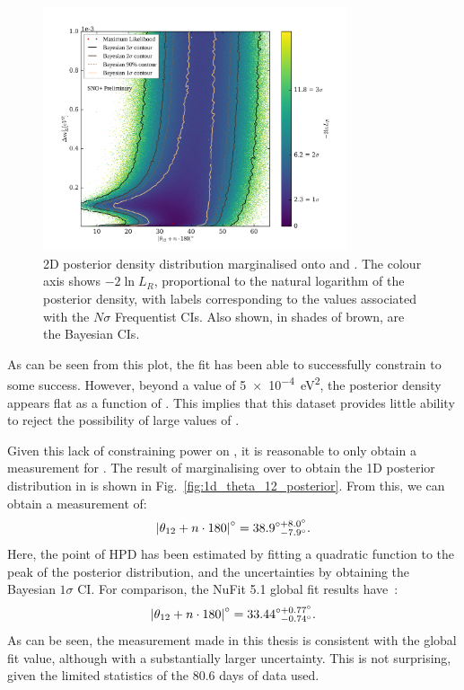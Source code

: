 \begin{figure}
    \centering
    \includegraphics[width=0.8\textwidth]{6_SolarAnalysis/images/steve_style_contours.png}
    \caption[2D posterior density distribution marginalised onto \dmsq{} and \tonetwo{}]
    {2D posterior density distribution marginalised onto \dmsq{} and \tonetwo{}. The colour axis shows $-2\ln{L_{R}}$, proportional to the natural logarithm of the posterior density, with labels corresponding to the values associated with the $N\sigma$ Frequentist CIs. Also shown, in shades of brown, are the Bayesian CIs.}
    \label{fig:2d_osc_param_posterior}
\end{figure}

As can be seen from this plot, the fit has been able to successfully constrain \tonetwo{} to some success. However, beyond a value of \SI{5e-4}{\eV\squared}, the posterior density appears flat as a function of \dmsq{}. This implies that this dataset provides little ability to reject the possibility of large values of \dmsq{}.

Given this lack of constraining power on \dmsq{}, it is reasonable to only obtain a measurement for \tonetwo{}. The result of marginalising over \dmsq{} to obtain the 1D posterior distribution in \tonetwo{} is shown in Fig.~\ref{fig:1d_theta_12_posterior}. From this, we can obtain a measurement of:
\begin{equation*}
    \left|\theta_{12}{} + n\cdot180\right|^{\circ} = 38.9^{\circ+8.0^{\circ}}_{\phantom{\circ}-7.9^{\circ}}.
\end{equation*}
Here, the point of HPD has been estimated by fitting a quadratic function to the peak of the posterior distribution, and the uncertainties by obtaining the Bayesian $1\sigma$ CI. For comparison, the NuFit 5.1 global fit results have~\cite{}: %
\begin{equation*}
    \left|\theta_{12}{} + n\cdot180\right|^{\circ} = 33.44^{\circ+0.77^{\circ}}_{\phantom{\circ}-0.74^{\circ}}.
\end{equation*}
As can be seen, the measurement made in this thesis is consistent with the global fit value, although with a substantially larger uncertainty. This is not surprising, given the limited statistics of the 80.6 days of data used.

